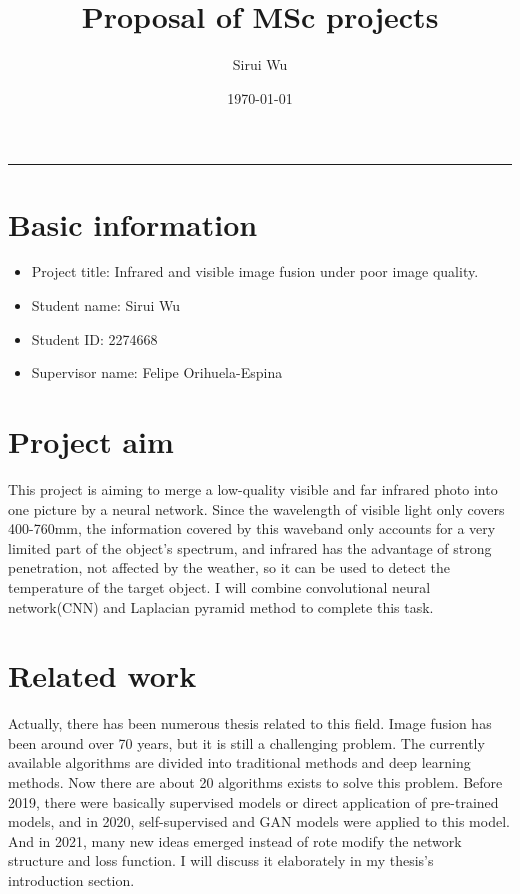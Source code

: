 \documentclass[a4paper,12pt]{article}
\begin{document}
\author{Sirui Wu}
\date{\today}
\title{Proposal of MSc projects}
\maketitle
\noindent\rule[0.25\baselineskip]{\textwidth}{1pt}

\section{Basic information}

\begin{itemize}
    \item Project title: Infrared and visible image fusion under poor image quality.
    \item Student name: Sirui Wu
    \item Student ID: 2274668
    \item Supervisor name: Felipe Orihuela-Espina
\end{itemize}



\section{Project aim}
This project is aiming to merge a low-quality visible and far infrared photo into one picture by a neural network. Since the wavelength of visible light only covers 400-760mm, the information covered by this waveband only accounts for a very limited part of the object's spectrum, and infrared has the advantage of strong penetration, not affected by the weather, so it can be used to detect the temperature of the target object. I will combine convolutional neural network(CNN) and Laplacian pyramid method to complete this task.

\section{Related work}
Actually, there has been numerous thesis related to this field. Image fusion has been around over 70 years, but it is still a challenging problem. The currently available algorithms are divided into traditional methods and deep learning methods. Now there are about 20 algorithms exists to solve this problem. Before 2019, there were basically supervised models or direct application of pre-trained models, and in 2020, self-supervised and GAN models were applied to this model. And in 2021, many new ideas emerged instead of rote modify the network structure and loss function. I will discuss it elaborately in my thesis's introduction section.
\end{document}
